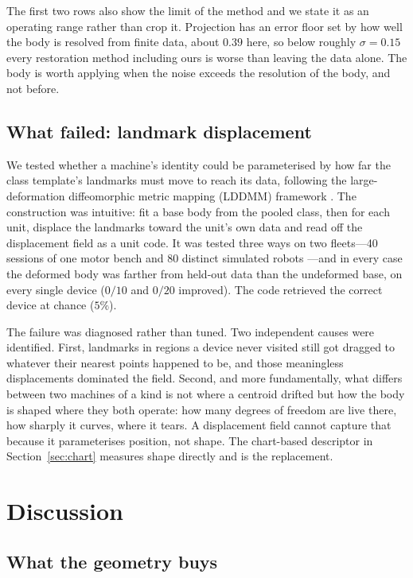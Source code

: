 \documentclass[11pt]{article}
\begin{document}
The first two rows also show the limit of the method and we state it as an
operating range rather than crop it. Projection has an error floor set by how
well the body is resolved from finite data, about $0.39$ here, so below
roughly $\sigma = 0.15$ every restoration method including ours is worse than
leaving the data alone. The body is worth applying when the noise exceeds the
resolution of the body, and not before.

\subsection{What failed: landmark displacement}
\label{sec:failed}

We tested whether a machine's identity could be parameterised by how far the
class template's landmarks must move to reach its data, following the
large-deformation diffeomorphic metric mapping (LDDMM) framework
\cite{beg2005,younes2010}. The construction was intuitive: fit a base body
from the pooled class, then for each unit, displace the landmarks toward the
unit's own data and read off the displacement field as a unit code. It was
tested three ways on two fleets---40 sessions of one motor bench
\cite{pmsm_data} and 80 distinct simulated robots \cite{ur5e}---and in every
case the deformed body was farther from held-out data than the undeformed
base, on every single device ($0/10$ and $0/20$ improved). The code retrieved
the correct device at chance ($5\%$).

The failure was diagnosed rather than tuned. Two independent causes were
identified. First, landmarks in regions a device never visited still got dragged
to whatever their nearest points happened to be, and those meaningless
displacements dominated the field. Second, and more fundamentally, what differs
between two machines of a kind is not where a centroid drifted but how the body
is shaped where they both operate: how many degrees of freedom are live there,
how sharply it curves, where it tears. A displacement field cannot capture
that because it parameterises position, not shape. The chart-based descriptor
in Section~\ref{sec:chart} measures shape directly and is the replacement.

\section{Discussion}

\subsection{What the geometry buys}
\end{document}
